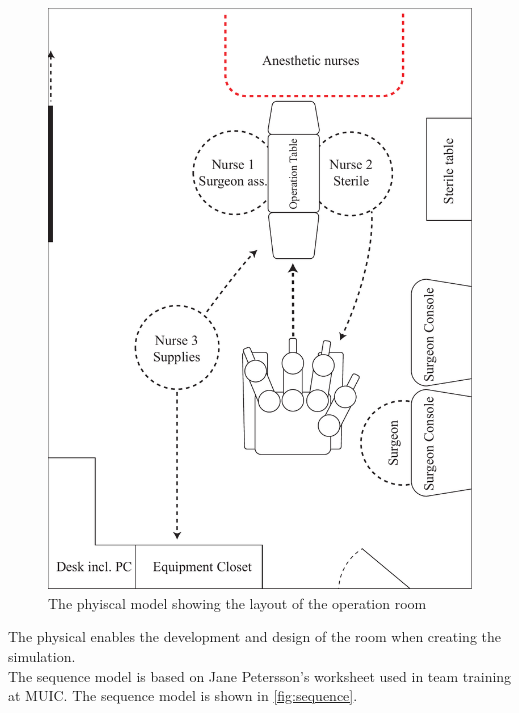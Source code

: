 \documentclass[paper=a4, fontsize=11pt]{scrartcl} %
\numberwithin{equation}{section} %
\numberwithin{figure}{section} %
\numberwithin{table}{section} %
\begin{document}
\begin{figure}[hpbt]
	\centering
	\includegraphics[width=\textwidth]{physical}
	\caption{The phyiscal model showing the layout of the operation room}
	\label{fig:layout}
\end{figure}

The physical enables the development and design of the room when creating the simulation.\\

The sequence model is based on Jane Petersson's worksheet used in team training at MUIC. The sequence model is shown in \autoref{fig:sequence}.
\end{document}
